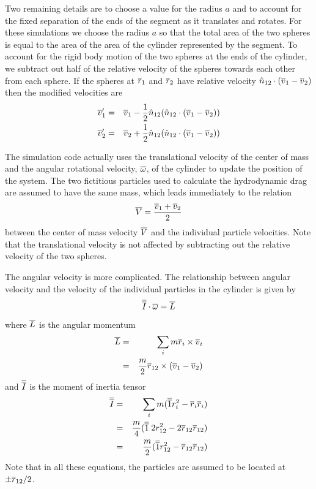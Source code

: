 \documentclass[12pt]{article}
\begin{document}
Two remaining details are to choose a value for the radius $a$ and
to account for the fixed separation of the ends of the segment as it translates
and rotates. For these simulations
we choose the radius $a$ so that the total area of the two spheres is equal to the
area of the area of the cylinder represented by the segment.
To account for the rigid body motion of the two spheres at the ends of the
cylinder, we subtract out half of the relative velocity of the spheres towards each
other from each sphere. If the spheres at $\overline{r}_1$ and $\overline{r}_2$ have relative
 velocity
$\hat{n}_{12}\cdot(\overline{v}_1-\overline{v}_2)$ then the modified velocities are
\begin{eqnarray*}
\overline{v}'_1 & = & \overline{v}_1 - \frac{1}{2}\hat{n}_{12}(\hat{n}_{12}\cdot(\overline{v}_1-\overline{v}_2)) \\
\overline{v}'_2 & = & \overline{v}_2 + \frac{1}{2}\hat{n}_{12}(\hat{n}_{12}\cdot(\overline{v}_1-\overline{v}_2))
\end{eqnarray*}

The simulation code actually uses the translational velocity of the center of mass and
the angular rotational velocity, $\overline{\omega}$, of the cylinder to update the position of the system.
The two fictitious particles used to  calculate the hydrodynamic drag are assumed to
have the same mass, which leads immediately to the relation
\[
\overline{V} = \frac{\overline{v}_1+\overline{v}_2}{2}
\]
between the center of mass velocity $\overline{V}$ and the individual particle velocities.
Note that the translational velocity is not affected by subtracting out the
relative velocity of the two spheres.

The angular velocity is more complicated. The relationship between angular velocity
and the velocity of the individual particles in the cylinder is given by
\[
\overline{\overline{I}}\cdot\overline{\omega} = \overline{L}
\]
where $\overline{L}$ is the angular momentum
\begin{eqnarray*}
\overline{L} & = & \sum_i m\overline{r}_i\times\overline{v}_i\\
& = & \frac{m}{2}\overline{r}_{12}\times(\overline{v}_1-\overline{v}_2)
\end{eqnarray*}
and $\overline{\overline{I}}$ is the moment of inertia tensor
\begin{eqnarray*}
\overline{\overline{I}} & = & \sum_i m (\overline{\overline{1}} r_i^2-\overline{r}_i\overline{r}_i) \\
& = & \frac{m}{4}(\overline{\overline{1}}\; 2r_{12}^2-2\overline{r}_{12}\overline{r}_{12}) \\
& = & \frac{m}{2}(\overline{\overline{1}} r_{12}^2-\overline{r}_{12}\overline{r}_{12}) \\
\end{eqnarray*}
Note that in all these equations, the particles are assumed to be located at
$\pm \overline{r}_{12}/2$.
\end{document}
